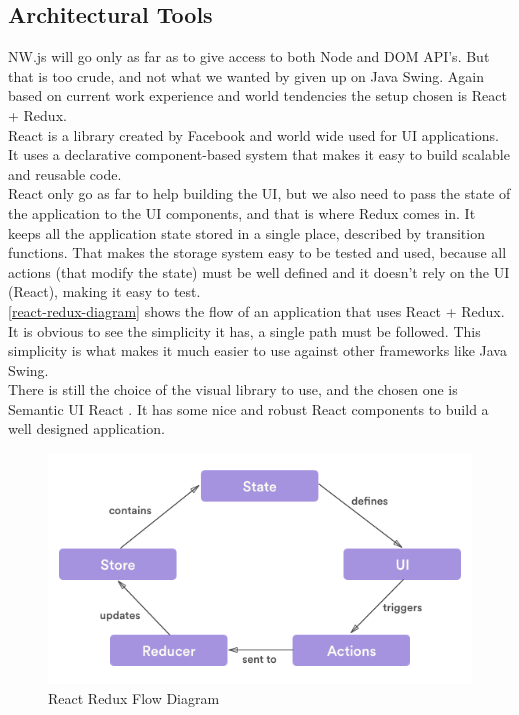 \subsection{Architectural Tools}
NW.js will go only as far as to give access to both Node and DOM API's. But that
is too crude, and not what we wanted by given up on Java Swing. Again based on
current work experience and world tendencies the setup chosen is React + Redux. \\
React \cite{React} is a library created by Facebook and world wide used for UI applications.
It uses a declarative component-based system that makes it easy to build scalable
and reusable code.\\
React only go as far to help building the UI, but we also need to pass the state
of the application to the UI components, and that is where Redux \cite{Redux} comes in.
It keeps all the application state stored in a single place, described by transition
functions. That makes the storage system easy to be tested and used, because all
actions (that modify the state) must be well defined and it doesn't rely on the
UI (React), making it easy to test.\\
\autoref{react-redux-diagram} shows the flow of an application that uses
React + Redux. It is obvious to see the simplicity it has, a single path must be followed.
This simplicity is what makes it much easier to use against other frameworks like
Java Swing. \\
There is still the choice of the visual library to use, and the chosen one is
Semantic UI React \cite{semantic-ui}. It has some nice and robust React components
to build a well designed application.

\begin{figure}[htb]
  \centering
  \caption{React Redux Flow Diagram}
  \label{react-redux-diagram}
  \includegraphics[scale=0.5]{images/react-redux-diagram}
\end{figure}


